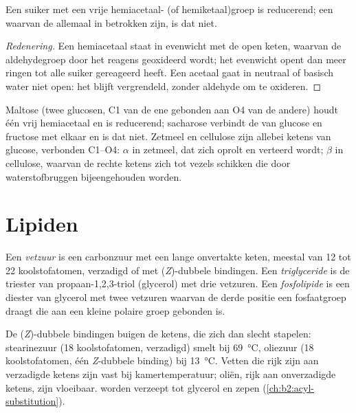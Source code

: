 \begin{proposition}\label{prop:b2:biomolecules:reducing}
Een suiker met een vrije hemiacetaal- (of hemiketaal)groep is reducerend; een  waarvan de 
allemaal in  betrokken zijn, is dat niet.
\end{proposition}

\begin{proof}[Redenering]
Een hemiacetaal staat in evenwicht met de open keten, waarvan de aldehydegroep door het reagens geoxideerd wordt;
het evenwicht opent dan meer ringen tot alle suiker gereageerd heeft. Een acetaal gaat in neutraal of
basisch water niet open: het  blijft vergrendeld, zonder aldehyde om te oxideren.
\end{proof}

Maltose (twee glucosen, C1 van de ene gebonden aan O4 van de andere) houdt één vrij hemiacetaal en is reducerend;
sacharose verbindt de  van glucose en fructose met elkaar en is dat niet. Zetmeel en
cellulose zijn allebei ketens van glucose, verbonden C1--O4: $\alpha$ in zetmeel, dat zich oprolt en verteerd wordt;
$\beta$ in cellulose, waarvan de rechte ketens zich tot vezels schikken die door waterstofbruggen bijeengehouden worden.

\section{Lipiden}

\begin{definition}[Lipiden]\label{def:b2:biomolecules:lipid}
Een \emph{vetzuur} is een carbonzuur met een lange onvertakte keten, meestal van 12 tot
22 koolstofatomen, verzadigd of met (\textit{Z})-dubbele bindingen. Een \emph{triglyceride} is de
triester van propaan-1,2,3-triol (glycerol) met drie vetzuren. Een
\emph{fosfolipide} is een diester van glycerol met twee vetzuren waarvan de derde
positie een fosfaatgroep draagt die aan een kleine polaire groep gebonden is.
\end{definition}

De (\textit{Z})-dubbele bindingen buigen de ketens, die zich dan slecht stapelen: stearinezuur (18 koolstofatomen,
verzadigd) smelt bij \qty{69}{\degreeCelsius}, oliezuur (18 koolstofatomen, één \textit{Z}-dubbele binding) bij
\qty{13}{\degreeCelsius}. Vetten die rijk zijn aan verzadigde ketens zijn vast bij kamertemperatuur; oliën, rijk aan
onverzadigde ketens, zijn vloeibaar.  worden verzeept tot glycerol en zepen
(\cref{ch:b2:acyl-substitution}).

